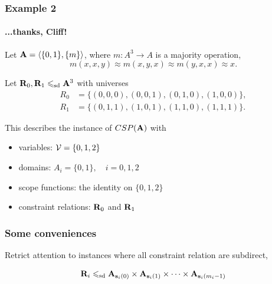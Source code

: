 \documentclass[xcolor=dvipsnames,9pt,hide notes,mathserif]{beamer}
\renewcommand{\alert}[1]{\textcolor{olivegreen}{#1}}
\begin{document}
\begin{frame}
  \frametitle{Example 2}
  \framesubtitle{...thanks, Cliff!}
  
  Let $\mathbf{A} = \langle\{0,1\}, \{m\}\rangle$, where $m: A^3 \to A$ is a majority operation, 
  \[m(x,x,y)\approx m(x,y,x)\approx m(y,x,x) \approx x.\]
  
  Let $\mathbf{R}_0, \mathbf{R}_1 \leqslant_{\mathrm{sd}} \mathbf{A}^3$ with universes
  \begin{align*}
    R_0 &= \{(0,0,0), (0,0,1), (0,1,0), (1,0,0)\},\\
    R_1 &= \{(0,1,1), (1,0,1), (1,1,0), (1,1,1)\}.
  \end{align*}

  This describes the instance of $CSP(\mathbf{A})$ with
  \begin{itemize}
  \item \alert{variables:} $\mathcal{V} = \{0,1,2\}$
  \item \alert{domains:} $A_i =\{0,1\}, \quad i = 0,1,2$
  \item \alert{scope functions:} the identity on $\{0,1,2\}$
  \item \alert{constraint relations:} $\mathbf{R}_0$ and $\mathbf{R}_1$
  \end{itemize}
\end{frame}
\begin{frame}
  \frametitle{Some conveniences}

  Retrict attention to instances where all constraint relation are
  subdirect,
  
  \[\mathbf{R}_i \leqslant_{\mathrm{sd}} \mathbf{A}_{\mathbf{s}_i(0)} \times \mathbf{A}_{\mathbf{s}_i(1)}\times \cdots \times \mathbf{A}_{\mathbf{s}_i(m_i-1)}\]

  \bigskip

  \bigskip


  \medskip

\end{frame}
\end{document}
